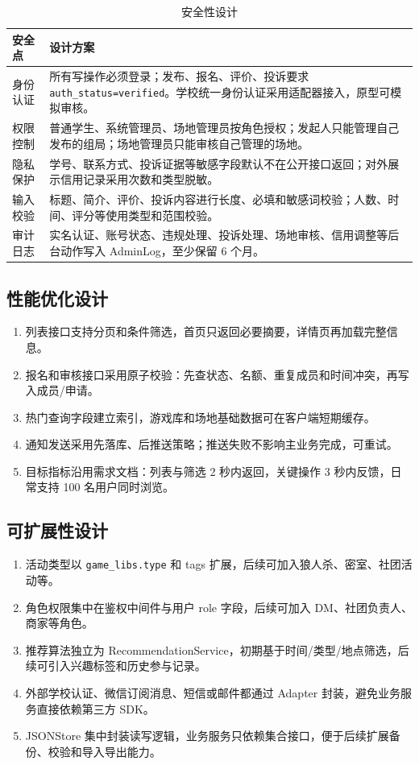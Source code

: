 \documentclass[a4paper]{article}
\begin{document}
\begin{table}[H]
  \centering
  \begin{tabularx}{\linewidth}{P{3.0cm} Y}
    \toprule
    安全点 & 设计方案 \\
    \midrule
    身份认证 & 所有写操作必须登录；发布、报名、评价、投诉要求 \texttt{auth\_status=verified}。学校统一身份认证采用适配器接入，原型可模拟审核。 \\
    权限控制 & 普通学生、系统管理员、场地管理员按角色授权；发起人只能管理自己发布的组局；场地管理员只能审核自己管理的场地。 \\
    隐私保护 & 学号、联系方式、投诉证据等敏感字段默认不在公开接口返回；对外展示信用记录采用次数和类型脱敏。 \\
    输入校验 & 标题、简介、评价、投诉内容进行长度、必填和敏感词校验；人数、时间、评分等使用类型和范围校验。 \\
    审计日志 & 实名认证、账号状态、违规处理、投诉处理、场地审核、信用调整等后台动作写入 AdminLog，至少保留 6 个月。 \\
    \bottomrule
  \end{tabularx}
  \caption{安全性设计}
\end{table}

\subsection{性能优化设计}

\begin{enumerate}
  \item 列表接口支持分页和条件筛选，首页只返回必要摘要，详情页再加载完整信息。
  \item 报名和审核接口采用原子校验：先查状态、名额、重复成员和时间冲突，再写入成员/申请。
  \item 热门查询字段建立索引，游戏库和场地基础数据可在客户端短期缓存。
  \item 通知发送采用先落库、后推送策略；推送失败不影响主业务完成，可重试。
  \item 目标指标沿用需求文档：列表与筛选 2 秒内返回，关键操作 3 秒内反馈，日常支持 100 名用户同时浏览。
\end{enumerate}

\subsection{可扩展性设计}

\begin{enumerate}
  \item 活动类型以 \texttt{game\_libs.type} 和 tags 扩展，后续可加入狼人杀、密室、社团活动等。
  \item 角色权限集中在鉴权中间件与用户 role 字段，后续可加入 DM、社团负责人、商家等角色。
  \item 推荐算法独立为 RecommendationService，初期基于时间/类型/地点筛选，后续可引入兴趣标签和历史参与记录。
  \item 外部学校认证、微信订阅消息、短信或邮件都通过 Adapter 封装，避免业务服务直接依赖第三方 SDK。
  \item JSONStore 集中封装读写逻辑，业务服务只依赖集合接口，便于后续扩展备份、校验和导入导出能力。
\end{enumerate}
\end{document}
